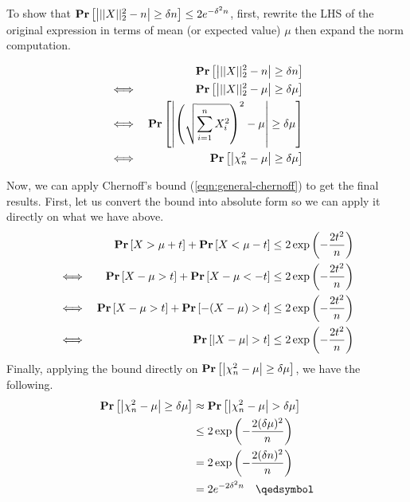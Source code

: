 To show that $\mathbf{Pr}\left[\left|||X||_2^2 - n\right| \geq \delta n\right] \leq 2e^{-\delta^2n}$, first, rewrite the LHS of the original expression in terms of mean (or expected value) $\mu$ then expand the norm computation.

\begin{equation*}
\begin{aligned}
	&&\mathbf{Pr}\left[\left|||X||_2^2 - n\right| \geq \delta n\right] \\
	\iff && \mathbf{Pr}\left[\left|||X||_2^2 - \mu\right| \geq \delta\mu\right] \\
	\iff && \mathbf{Pr}\left[\left|\left(\sqrt{\sum_{i=1}^n X_i^2}\right)^2 - \mu\right| \geq \delta\mu\right] \\
	\iff && \mathbf{Pr}\left[\left|\chi^2_n - \mu\right| \geq \delta\mu\right]
\end{aligned}
\end{equation*}

Now, we can apply Chernoff's bound (\ref{eqn:general-chernoff}) to get the final results. First, let us convert the bound into absolute form so we can apply it directly on what we have above.
\begin{equation*}
\begin{aligned}
	&& \mathbf{Pr}\left[X > \mu + t\right] + \mathbf{Pr}\left[X < \mu - t\right] &\leq 2\exp\left(-\frac{2t^2}{n}\right) \\
	\iff && \mathbf{Pr}\left[X - \mu > t\right] + \mathbf{Pr}\left[X - \mu < - t\right] &\leq 2\exp\left(-\frac{2t^2}{n}\right) \\
	\iff && \mathbf{Pr}\left[X - \mu > t\right] + \mathbf{Pr}\left[- (X - \mu) > t\right] &\leq 2\exp\left(-\frac{2t^2}{n}\right) \\
	\iff && \mathbf{Pr}\left[|X - \mu| > t\right] &\leq 2\exp\left(-\frac{2t^2}{n}\right)
\end{aligned}
\end{equation*}
Finally, applying the bound directly on $\mathbf{Pr}\left[\left|\chi^2_n - \mu\right| \geq \delta\mu\right]$, we have the following.
\begin{equation*}
\begin{aligned}
	\pr{\left|\chi^2_n - \mu\right| \geq \delta\mu}
		&\approx \pr{\left|\chi^2_n - \mu\right| > \delta\mu} \\
		&\leq 2\exp\left(-\frac{2(\delta\mu)^2}{n}\right) \\
		&= 2\exp\left(-\frac{2(\delta n)^2}{n}\right) \\
		&= 2e^{-2\delta^2n} \quad \qedsymbol
\end{aligned}
\end{equation*}
